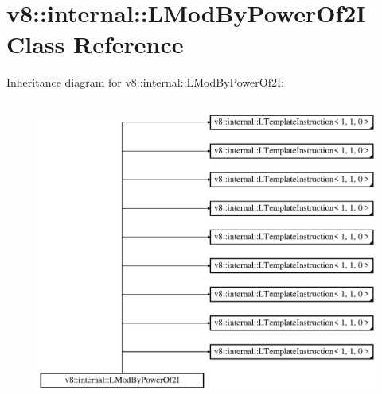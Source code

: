 \hypertarget{classv8_1_1internal_1_1_l_mod_by_power_of2_i}{}\section{v8\+:\+:internal\+:\+:L\+Mod\+By\+Power\+Of2I Class Reference}
\label{classv8_1_1internal_1_1_l_mod_by_power_of2_i}
Inheritance diagram for v8\+:\+:internal\+:\+:L\+Mod\+By\+Power\+Of2I\+:\begin{figure}[H]
\begin{center}
\leavevmode
\includegraphics[height=10.000000cm]{classv8_1_1internal_1_1_l_mod_by_power_of2_i}
\end{center}
\end{figure}
